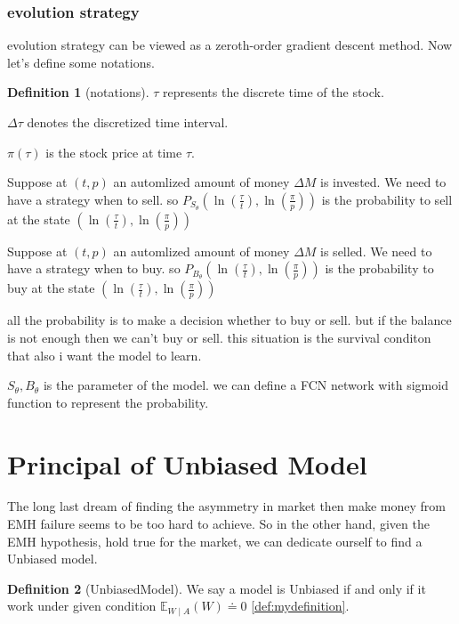 \documentclass{article}
\theoremstyle{definition} %
\newtheorem{definition}{Definition}[section]
\begin{document}
\subsubsection{evolution strategy}
evolution strategy can be viewed as a
zeroth-order gradient descent method.
Now let's define some notations.
\begin{definition}[notations]
    \label{def:notations}
    $\tau$ represents the discrete time of the stock.

    $\Delta\tau$ denotes the discretized time interval.

    $\pi(\tau)$ is the stock price at time $\tau$.

    Suppose at $(t,p)$
    an automlized amount
    of money $\Delta M$ is invested.
    We need to have a strategy when to sell.
    so $P_{S_\theta}(\ln(\frac{\tau}{t}),\ln(\frac{\pi}{p}))$
    is the probability to sell at the state
    $(\ln(\frac{\tau}{t}),\ln(\frac{\pi}{p}))$

    Suppose at $(t,p)$
    an automlized amount
    of money $\Delta M$ is selled.
    We need to have a strategy when to buy.
    so $P_{B_\theta}(\ln(\frac{\tau}{t}),\ln(\frac{\pi}{p}))$
    is the probability to buy at the state
    $(\ln(\frac{\tau}{t}),\ln(\frac{\pi}{p}))$

    all the probability is to make a decision
    whether to buy or sell. but if the balance is
    not enough then we can't buy or sell.
    this situation is the survival conditon that
    also i want the model to learn.

    $S_\theta,B_\theta$ is the
    parameter of the model.
    we can define a FCN network with sigmoid
    function to represent the probability.


\end{definition}

\section{Principal of Unbiased Model}
The long last dream of finding the asymmetry
in market then make money from EMH failure
seems to be too hard to achieve.
So in the other hand, given the EMH hypothesis,
hold true for the market, we can dedicate
ourself to find a Unbiased model.

\begin{definition}[UnbiasedModel]
    \label{def:UnbiasedModel}
    We say a model is Unbiased if and
    only if it work under given condition
    $\mathbb{E}_{W\mid A}(W)\doteq 0$
    \ref{def:mydefinition}.
\end{definition}
\end{document}
